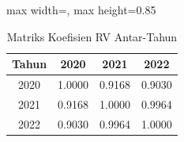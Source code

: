 \begin{table}[H]
\centering
\caption{Matriks Koefisien RV Antar-Tahun} \label{tab:rv_sample}
\begin{adjustbox}{max width=\textwidth, max height=0.85\textheight}
\begin{tabular}{|c|c|c|c|}
\hline
\textbf{Tahun} & \textbf{2020} & \textbf{2021} & \textbf{2022} \\
\hline
2020 & 1.0000 & 0.9168 & 0.9030 \\
2021 & 0.9168 & 1.0000 & 0.9964 \\
2022 & 0.9030 & 0.9964 & 1.0000 \\
\hline
\end{tabular}
\end{adjustbox}
\end{table}